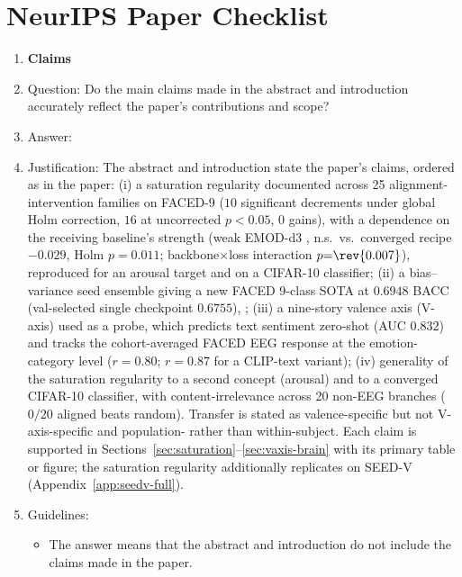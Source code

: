 \section*{NeurIPS Paper Checklist}

\begin{enumerate}

\item {\bf Claims}
    \item[] Question: Do the main claims made in the abstract and introduction accurately reflect the paper's contributions and scope?
    \item[] Answer: \answerYes{}
    \item[] Justification: The abstract and introduction state the paper's claims, ordered as in the paper: (i) a saturation regularity documented across 25 alignment-intervention families on FACED-9 ($10$ significant decrements under global Holm correction, $16$ at uncorrected $p<0.05$, $0$ gains), with a dependence on the receiving baseline's strength (weak EMOD-d3 , n.s.\ vs.\ converged recipe $-0.029$, Holm $p{=}0.011$; backbone$\times$loss interaction $p{=}\rev{0.007}$), reproduced for an arousal target and on a CIFAR-10 classifier; (ii) a bias--variance seed ensemble giving a new FACED 9-class SOTA at $0.6948$ BACC (val-selected single checkpoint $0.6755$), ; (iii) a nine-story valence axis (V-axis) used as a probe, which predicts text sentiment zero-shot (AUC $0.832$) and tracks the cohort-averaged FACED EEG response at the emotion-category level ($r{=}0.80$; $r{=}0.87$ for a CLIP-text variant); (iv) generality of the saturation regularity to a second concept (arousal) and to a converged CIFAR-10 classifier, with content-irrelevance across 20 non-EEG branches ($0/20$ aligned beats random). Transfer is stated as valence-specific but not V-axis-specific and population- rather than within-subject. Each claim is supported in Sections~\ref{sec:saturation}--\ref{sec:vaxis-brain} with its primary table or figure; the saturation regularity additionally replicates on SEED-V (Appendix~\ref{app:seedv-full}).
    \item[] Guidelines:
    \begin{itemize}
        \item The answer \answerNA{} means that the abstract and introduction do not include the claims made in the paper.

\end{itemize}
\end{enumerate}
